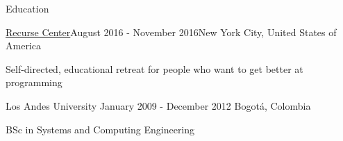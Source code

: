 \documentclass{resume} %
\def\uniandes{Los Andes University }
\begin{document}

\begin{rSection}{Education}

\begin{rSubsection}{\href{https://www.recurse.com/about}{Recurse Center}}{August 2016 - November 2016}{New York City, United States of America}
\item Self-directed, educational retreat for people who want to get better at programming
\end{rSubsection}

\begin{rSubsection}{\uniandes}{January 2009 - December 2012} {Bogot\'a, Colombia}
\item BSc in Systems and Computing Engineering  
\end{rSubsection}

\end{rSection}


\end{document}
